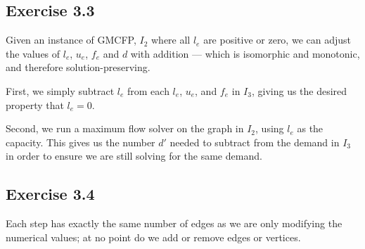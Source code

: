 \subsection{Exercise 3.3}

Given an instance of GMCFP, $I_2$ where all $l_e$ are positive or zero, we can
adjust the values of $l_e$, $u_e$, $f_e$ and $d$ with addition --- which is
isomorphic and monotonic, and therefore solution-preserving.

First, we simply subtract $l_e$ from each $l_e$, $u_e$, and $f_e$ in $I_3$, giving us the
desired property that $l_e = 0$.

Second, we run a maximum flow solver on the graph in $I_2$, using $l_e$ as the capacity. This
gives us the number $d'$ needed to subtract from the demand in $I_3$ in order to ensure we are still
solving for the same demand.

\subsection{Exercise 3.4}

Each step has exactly the same number of edges as we are only modifying the numerical values; at
no point do we add or remove edges or vertices.
